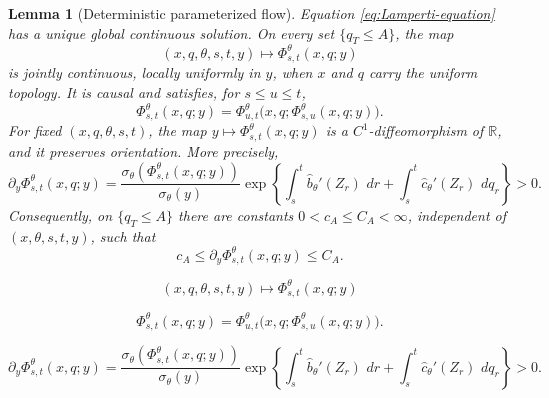 \documentclass[10pt,a4paper]{amsart}
\newtheorem{lemma}{Lemma}
\newcommand{\R}{\mathbb R}
\newcommand{\dd}{\,d}
\begin{document}
\begin{lemma}[Deterministic parameterized flow]
\label{lem:deterministic-flow}
Equation \eqref{eq:Lamperti-equation} has a unique global continuous
solution.  On every set \(\{q_T\le A\}\), the map
\begin{equation}\label{eq:joint-flow-continuity}
  (x,q,\theta,s,t,y)
  \longmapsto
  \Phi_{s,t}^\theta(x,q;y)
\end{equation}
is jointly continuous, locally uniformly in \(y\), when \(x\) and \(q\)
carry the uniform topology.  It is causal and satisfies, for
\(s\le u\le t\),
\begin{equation}\label{eq:cocycle}
  \Phi_{s,t}^\theta(x,q;y)
  =
  \Phi_{u,t}^\theta
  \bigl(x,q;\Phi_{s,u}^\theta(x,q;y)\bigr).
\end{equation}
For fixed \((x,q,\theta,s,t)\), the map
\(y\mapsto\Phi_{s,t}^\theta(x,q;y)\) is a \(C^1\)-diffeomorphism of
\(\R\), and it preserves orientation.  More precisely,
\begin{equation}\label{eq:flow-derivative}
  \partial_y\Phi_{s,t}^\theta(x,q;y)
  =
  \frac{\sigma_\theta(\Phi_{s,t}^\theta(x,q;y))}
       {\sigma_\theta(y)}
  \exp\!\left\{
    \int_s^t\widehat b_\theta'(Z_r)\,\dd r
    +\int_s^t\widehat c_\theta'(Z_r)\,\dd q_r
  \right\}>0.
\end{equation}
Consequently, on \(\{q_T\le A\}\) there are constants
\(0<c_A\le C_A<\infty\), independent of
\((x,\theta,s,t,y)\), such that
\begin{equation}\label{eq:flow-bi-Lipschitz}
  c_A\le\partial_y\Phi_{s,t}^\theta(x,q;y)\le C_A.
\end{equation}
\end{lemma}

\begin{equation}
  (x,q,\theta,s,t,y)
  \longmapsto
  \Phi_{s,t}^\theta(x,q;y)
\end{equation}

\begin{equation}
  \Phi_{s,t}^\theta(x,q;y)
  =
  \Phi_{u,t}^\theta
  \bigl(x,q;\Phi_{s,u}^\theta(x,q;y)\bigr).
\end{equation}

\begin{equation}
  \partial_y\Phi_{s,t}^\theta(x,q;y)
  =
  \frac{\sigma_\theta(\Phi_{s,t}^\theta(x,q;y))}
       {\sigma_\theta(y)}
  \exp\!\left\{
    \int_s^t\widehat b_\theta'(Z_r)\,\dd r
    +\int_s^t\widehat c_\theta'(Z_r)\,\dd q_r
  \right\}>0.
\end{equation}
\end{document}
